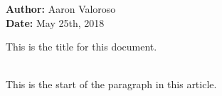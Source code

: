 \documentclass[11pt,a4papper]{article}
\begin{document}
\noindent\textbf{Author: } Aaron Valoroso \\
\textbf{Date: } May 25th, 2018 \\[1cm]
\centerline{This is the title for this document.} \\[1cm]

This is the start of the paragraph in this article.
\end{document}
